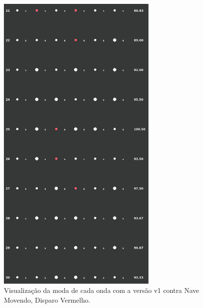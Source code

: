 \begin{figure}[H]
  \centering
  \includegraphics[width=0.7\textwidth]{figuras/ss/ss_redmove_ai_mode_1_3.png}
  \caption{Visualização da moda de cada onda com a versão v1 contra Nave Movendo, Disparo Vermelho.}
  \label{fig:ss-moda-rm-1-3}
\end{figure}